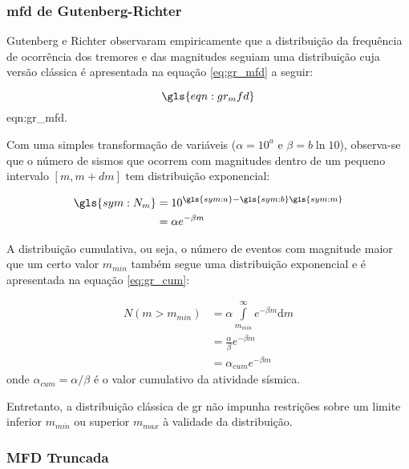 \subsubsection{\gls{mfd} de Gutenberg-Richter}
\label{sec:grmfd}

Gutenberg e Richter \citep{gr_1954} observaram empiricamente que a distribuição da frequência de ocorrência dos tremores e das
magnitudes seguiam uma distribuição cuja versão clássica é apresentada na equação \ref{eq:gr_mfd} a seguir:

\begin{equation}
	\gls{eqn:gr_mfd}
	\label{eq:gr_mfd}
\end{equation}
\glsdesc*{eqn:gr_mfd}.

Com uma simples transformação de variáveis ($\alpha = 10^a$ e $\beta = b\ln{10}$), observa-se que o número de sismos que ocorrem 
com magnitudes dentro de um pequeno intervalo $[m, m+dm]$ tem distribuição exponencial:

\begin{equation}
	\begin{split}
		\gls{sym:N_m} &= 10^{\gls{sym:a} - \gls{sym:b}\gls{sym:m}} \\
					  &= \alpha e^{-\beta m}
	\end{split}
	\label{eq:gr_exp}
\end{equation}

A distribuição cumulativa, ou seja, o número de eventos com magnitude maior que um certo valor $m_{min}$ também segue uma
distribuição exponencial e é apresentada na equação \ref{eq:gr_cum}:

\begin{equation}
	\begin{split}
		N(m > m_{min}) &= \alpha \int\limits_{m_{min}}^{\infty}e^{-\beta m}\mathrm{d}m \\
					   &= \frac{\alpha}{\beta} e^{-\beta m} \\
					   &= \alpha_{cum} e^{-\beta m}
	\end{split}
	\label{eq:gr_cum}
\end{equation}
onde $\alpha_{cum} = \alpha / \beta $ é o valor cumulativo da atividade sísmica.


Entretanto, a distribuição clássica de \gls{gr} não impunha restrições sobre um limite inferior $m_{min}$ 
ou superior $m_{max}$ à validade da distribuição.



\subsubsection{MFD Truncada}
\label{sec:TMFD}

